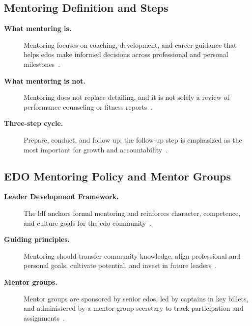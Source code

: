 \documentclass[../main.tex]{subfiles}
\begin{document}
\subsection{Mentoring Definition and Steps}
\begin{description}
  \item[\textbf{What mentoring is.}] Mentoring focuses on coaching, development, and career guidance that
  helps \ac{edo}s make informed decisions across professional and personal milestones~\autocite{edo-5-2-6-mentoring-tips-2025}.
  \item[\textbf{What mentoring is not.}] Mentoring does not replace detailing, and it is not solely a review
  of performance counseling or fitness reports~\autocite{edo-5-2-6-mentoring-tips-2025}.
  \item[\textbf{Three-step cycle.}] Prepare, conduct, and follow up; the follow-up step is emphasized as the
  most important for growth and accountability~\autocite{edo-5-2-6-mentoring-tips-2025}.
\end{description}

\subsection{EDO Mentoring Policy and Mentor Groups}
\begin{description}
  \item[\textbf{Leader Development Framework.}] The \ac{ldf} anchors formal mentoring and reinforces
  character, competence, and culture goals for the \ac{edo} community~\autocite{edo-5-2-6-mentoring-tips-2025}.
  \item[\textbf{Guiding principles.}] Mentoring should transfer community knowledge, align professional
  and personal goals, cultivate potential, and invest in future leaders~\autocite{edo-5-2-6-mentoring-tips-2025}.
  \item[\textbf{Mentor groups.}] Mentor groups are sponsored by senior \acp{edo}, led by captains in key
  billets, and administered by a mentor group secretary to track participation and assignments~\autocite{edo-5-2-6-mentoring-tips-2025}.
\end{description}
\end{document}
